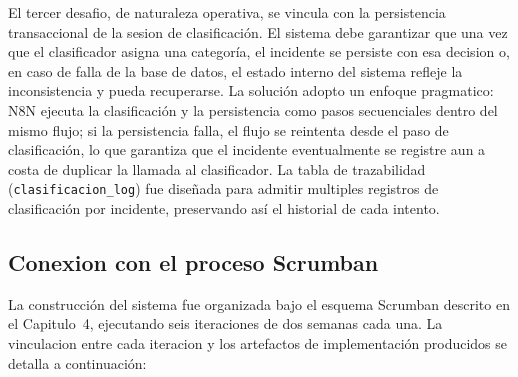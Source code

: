 El tercer desafio, de naturaleza operativa, se vincula con la persistencia transaccional de la sesion de clasificación. El sistema debe garantizar que una vez que el clasificador asigna una categoría, el incidente se persiste con esa decision o, en caso de falla de la base de datos, el estado interno del sistema refleje la inconsistencia y pueda recuperarse. La solución adopto un enfoque pragmatico: N8N ejecuta la clasificación y la persistencia como pasos secuenciales dentro del mismo flujo; si la persistencia falla, el flujo se reintenta desde el paso de clasificación, lo que garantiza que el incidente eventualmente se registre aun a costa de duplicar la llamada al clasificador. La tabla de trazabilidad (\texttt{clasificacion\_log}) fue diseñada para admitir multiples registros de clasificación por incidente, preservando así el historial de cada intento.

\subsection{Conexion con el proceso Scrumban}

La construcción del sistema fue organizada bajo el esquema Scrumban descrito en el Capitulo~4, ejecutando seis iteraciones de dos semanas cada una. La vinculacion entre cada iteracion y los artefactos de implementación producidos se detalla a continuación:

